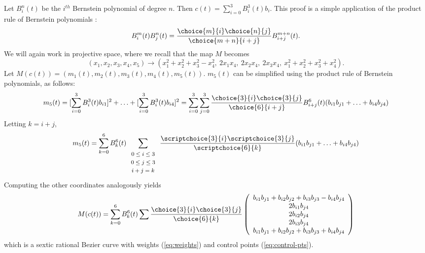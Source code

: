 \prf
Let $B_i^n(t)$ be the $i^{th}$ Bernstein polynomial of degree $n$.
Then $c(t) = \sum_{i=0}^3 B_i^3(t) b_{i}$.
This proof is a simple application of the product rule of Bernstein polynomials
\cite{farin97}:
\[
	B_i^m(t) B_j^n(t) = \frac{\choice{m}{i} \choice{n}{j}}{\choice{m+n}{i+j}}
		B_{i+j}^{m+n}(t).
\]
We will again work in projective space, where we recall that
the map $M$ becomes
\[
	 (x_1,x_2,x_3,x_4,x_5) \rightarrow
	 (x_1^2 + x_2^2 + x_3^2 - x_4^2,\ 
	 2x_1 x_4,\ 2x_2 x_4,\ 2x_3 x_4,\ 
	 x_1^2 + x_2^2 + x_3^2 + x_4^2).
\]
Let $M(c(t)) = (m_1(t),m_2(t),m_3(t),m_4(t),m_5(t))$.
$m_5(t)$ can be simplified using the product rule 
of Bernstein polynomials, as follows:
\[ m_5(t) =  [\sum_{i=0}^3 B_i^3(t) b_{i1}]^2 + 
	\ldots + [\sum_{i=0}^3 B_i^3(t) b_{i4}]^2
     =   \sum_{i=0}^3 \sum_{j=0}^3 
	\frac{\choice{3}{i} \choice{3}{j}}{\choice{6}{i+j}}
       B^6_{i+j}(t) (b_{i1} b_{j1} + \ldots + b_{i4} b_{j4})
\]
Letting $k=i+j$, 
\[ m_5(t) = \sum_{k=0}^6 B_k^6(t) 
	\sum_{\begin{array}{c}  \mbox{\footnotesize{$0 \leq i \leq 3$}} \\ 
			     \mbox{\footnotesize{$0 \leq j \leq 3$}} \\ 
			     \mbox{\footnotesize{$i+j=k$}}
			     \end{array}} 
	\frac{\scriptchoice{3}{i} \scriptchoice{3}{j}}{\scriptchoice{6}{k}}
	(b_{i1} b_{j1} + \ldots + b_{i4} b_{j4}) \]
Computing the other coordinates analogously yields
\[ M(c(t)) = 
   \sum_{k=0}^6 B_k^6(t)
	\sum \frac{\choice{3}{i} \choice{3}{j}}{\choice{6}{k}}
	\left( \begin{array}{c}
            b_{i1} b_{j1} + b_{i2} b_{j2} + b_{i3} b_{j3} - b_{i4} b_{j4} \\
            2b_{i1} b_{j4} \\
            2b_{i2} b_{j4} \\
            2b_{i3} b_{j4} \\
            b_{i1} b_{j1} + b_{i2} b_{j2} + b_{i3} b_{j3} + b_{i4} b_{j4}
	\end{array} \right) \]
%
which is a sextic rational Bezier curve with weights (\ref{eq:weights}) and 
control points (\ref{eq:control-pts}).
\QED

